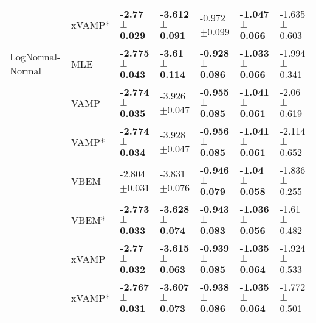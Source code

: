 \begin{tabular}{lllllll}
                 & xVAMP* &   \textbf{-2.77$\pm$0.029} &  \textbf{-3.612$\pm$0.091} &           -0.972$\pm$0.099 &  \textbf{-1.047$\pm$0.066} &           -1.635$\pm$0.603 \\
LogNormal-Normal & MLE &  \textbf{-2.775$\pm$0.043} &   \textbf{-3.61$\pm$0.114} &  \textbf{-0.928$\pm$0.086} &  \textbf{-1.033$\pm$0.066} &           -1.994$\pm$0.341 \\
                 & VAMP &  \textbf{-2.774$\pm$0.035} &           -3.926$\pm$0.047 &  \textbf{-0.955$\pm$0.085} &  \textbf{-1.041$\pm$0.061} &            -2.06$\pm$0.619 \\
                 & VAMP* &  \textbf{-2.774$\pm$0.034} &           -3.928$\pm$0.047 &  \textbf{-0.956$\pm$0.085} &  \textbf{-1.041$\pm$0.061} &           -2.114$\pm$0.652 \\
                 & VBEM &           -2.804$\pm$0.031 &           -3.831$\pm$0.076 &  \textbf{-0.946$\pm$0.079} &   \textbf{-1.04$\pm$0.058} &           -1.836$\pm$0.255 \\
                 & VBEM* &  \textbf{-2.773$\pm$0.033} &  \textbf{-3.628$\pm$0.074} &  \textbf{-0.943$\pm$0.083} &  \textbf{-1.036$\pm$0.056} &            -1.61$\pm$0.482 \\
                 & xVAMP &   \textbf{-2.77$\pm$0.032} &  \textbf{-3.615$\pm$0.063} &  \textbf{-0.939$\pm$0.085} &  \textbf{-1.035$\pm$0.064} &           -1.924$\pm$0.533 \\
                 & xVAMP* &  \textbf{-2.767$\pm$0.031} &  \textbf{-3.607$\pm$0.073} &  \textbf{-0.938$\pm$0.086} &  \textbf{-1.035$\pm$0.064} &           -1.772$\pm$0.501 \\
\bottomrule
\end{tabular}

